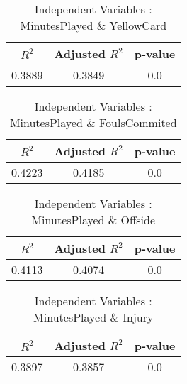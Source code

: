 \documentclass[12pt]{article}
\begin{document}
\begin{minipage}{0.4\textwidth}
	\begin{table}[H]
		\centering
		\caption{Independent Variables : MinutesPlayed \& YellowCard}\label{table:1a}
		{\begin{tabular}{|c|c|c|}
				\hline
				$ R^2 $ & Adjusted $ R^2 $ & p-value \\
				\hline
				0.3889 & 0.3849 & 0.0 \\
				\hline
			\end{tabular}
		}
	\end{table}
\end{minipage}
\hfill
\begin{minipage}{0.4\textwidth}
	\begin{table}[H]
		\centering
		\caption{Independent Variables : MinutesPlayed \& FoulsCommited}\label{table:1a}
		{\begin{tabular}{|c|c|c|}
				\hline
				$ R^2 $ & Adjusted $ R^2 $ & p-value \\
				\hline
				0.4223 & 0.4185 & 0.0 \\
				\hline
			\end{tabular}
		}
	\end{table}
\end{minipage}
\hfill
\begin{minipage}{0.4\textwidth}
	\begin{table}[H]
		\centering
		\caption{Independent Variables : MinutesPlayed \& Offside}\label{table:1a}
		{\begin{tabular}{|c|c|c|}
				\hline
				$ R^2 $ & Adjusted $ R^2 $ & p-value \\
				\hline
				0.4113 & 0.4074 & 0.0 \\
				\hline
			\end{tabular}
		}
	\end{table}
\end{minipage}
\hfill
\begin{minipage}{0.4\textwidth}
\begin{table}[H]
	\centering
	\caption{Independent Variables : MinutesPlayed \& Injury}\label{table:1a}
	{\begin{tabular}{|c|c|c|}
			\hline
			$ R^2 $ & Adjusted $ R^2 $ & p-value \\
			\hline
			0.3897 & 0.3857 & 0.0 \\
			\hline
		\end{tabular}
	}
\end{table}
\end{minipage}
\end{document}
